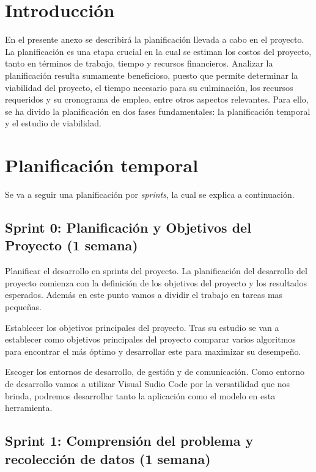 
\section{Introducción}

En el presente anexo se describirá la planificación llevada a cabo en el proyecto. La planificación es una etapa crucial en la cual se estiman los costos del proyecto, tanto en términos de trabajo, tiempo y recursos financieros. Analizar la planificación resulta sumamente beneficioso, puesto que permite determinar la viabilidad del proyecto, el tiempo necesario para su culminación, los recursos requeridos y su cronograma de empleo, entre otros aspectos relevantes. Para ello, se ha divido la planificación en dos fases fundamentales: la planificación temporal y el estudio de viabilidad.

\section{Planificación temporal}

Se va a seguir una planificación por \textit{sprints}, la cual se explica a continuación.

\subsection{Sprint 0: Planificación y Objetivos del Proyecto (1 semana)}

Planificar el desarrollo en sprints del proyecto.
La planificación del desarrollo del proyecto comienza con la definición de los objetivos del proyecto y los resultados esperados. Además en este punto vamos a dividir el trabajo en tareas mas pequeñas.

Establecer los objetivos principales del proyecto.
Tras su estudio se van a establecer como objetivos principales del proyecto comparar varios algoritmos para encontrar el más óptimo y desarrollar este para maximizar su desempeño.

Escoger los entornos de desarrollo, de gestión y de comunicación.
Como entorno de desarrollo vamos a utilizar Visual Sudio Code por la versatilidad que nos brinda, podremos desarrollar tanto la aplicación como el modelo en esta herramienta.


\subsection{Sprint 1: Comprensión del problema y recolección de datos (1 semana)} 

